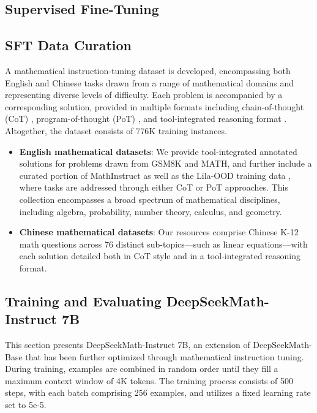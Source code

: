 \begin{itemize}[topsep=0pt]
\section{Supervised Fine-Tuning}

\subsection{SFT Data Curation}

A mathematical instruction-tuning dataset is developed, encompassing both English and Chinese tasks drawn from a range of mathematical domains and representing diverse levels of difficulty. Each problem is accompanied by a corresponding solution, provided in multiple formats including chain-of-thought (CoT) \citep{cot}, program-of-thought (PoT) \citep{pot,pal}, and tool-integrated reasoning format \citep{tora}. Altogether, the dataset consists of 776K training instances.

\begin{itemize}[topsep=0pt]
    \item \textbf{English mathematical datasets}: We provide tool-integrated annotated solutions for problems drawn from GSM8K and MATH, and further include a curated portion of MathInstruct \citep{MathInstruct} as well as the Lila-OOD training data \citep{lila}, where tasks are addressed through either CoT or PoT approaches. This collection encompasses a broad spectrum of mathematical disciplines, including algebra, probability, number theory, calculus, and geometry.
    \item \textbf{Chinese mathematical datasets}: Our resources comprise Chinese K-12 math questions across 76 distinct sub-topics—such as linear equations—with each solution detailed both in CoT style and in a tool-integrated reasoning format.
\end{itemize}

\subsection{Training and Evaluating DeepSeekMath-Instruct 7B}

This section presents DeepSeekMath-Instruct 7B, an extension of DeepSeekMath-Base that has been further optimized through mathematical instruction tuning. During training, examples are combined in random order until they fill a maximum context window of 4K tokens. The training process consists of 500 steps, with each batch comprising 256 examples, and utilizes a fixed learning rate set to 5e-5.


\end{itemize}
